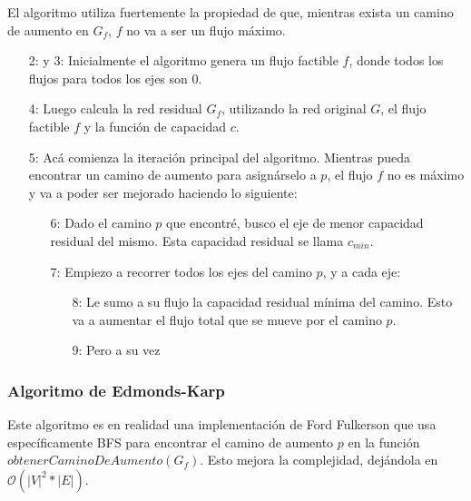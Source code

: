 El algoritmo utiliza fuertemente la propiedad de que, mientras exista un camino de aumento en $G_f$, $f$ no va a ser un flujo m\'aximo. 

\begin{enumerate}
\item [2: y 3:] Inicialmente el algoritmo genera un flujo factible $f$, donde todos los flujos para todos los ejes son $0$.
\item [4:] Luego calcula la red residual $G_f$, utilizando la red original $G$, el flujo factible $f$ y la funci\'on de capacidad $c$.
\item [5:] Ac\'a comienza la iteraci\'on principal del algoritmo. Mientras pueda encontrar un camino de aumento para asign\'arselo a $p$, el flujo $f$ no es m\'aximo y va a poder ser mejorado haciendo lo siguiente:
  \begin{enumerate}
  \item [6:] Dado el camino $p$ que encontr\'e, busco el eje de menor capacidad residual del mismo. Esta capacidad residual se llama $c_{min}$.
  \item [7:] Empiezo a recorrer todos los ejes del camino $p$, y a cada eje:
    \begin{enumerate}
      \item [8:] Le sumo a su flujo la capacidad residual m\'inima del camino. Esto va a aumentar el flujo total que se mueve por el camino $p$.
      \item [9:] Pero a su vez
    \end{enumerate}
  \end{enumerate}
\end{enumerate}

\subsubsection{Algoritmo de Edmonds-Karp}

Este algoritmo es en realidad una implementaci\'on de Ford Fulkerson que usa espec\'ificamente BFS para encontrar el camino de aumento $p$ en la funci\'on $obtenerCaminoDeAumento(G_f)$. Esto mejora la complejidad, dej\'andola en $\mathcal{O}(|V|^2 * |E|)$.
